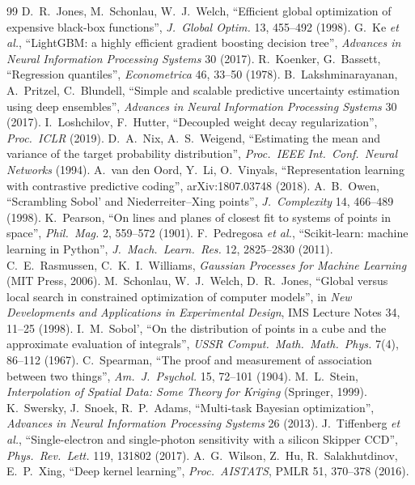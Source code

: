 \documentclass[10pt,a4paper]{article}
\begin{document}
\begin{thebibliography}{99}
 D.~R.~Jones, M.~Schonlau, W.~J.~Welch, ``Efficient global optimization of expensive black-box functions'', \emph{J.\ Global Optim.} 13, 455--492 (1998).
 G.~Ke \emph{et al.}, ``LightGBM: a highly efficient gradient boosting decision tree'', \emph{Advances in Neural Information Processing Systems} 30 (2017).
 R.~Koenker, G.~Bassett, ``Regression quantiles'', \emph{Econometrica} 46, 33--50 (1978).
 B.~Lakshminarayanan, A.~Pritzel, C.~Blundell, ``Simple and scalable predictive uncertainty estimation using deep ensembles'', \emph{Advances in Neural Information Processing Systems} 30 (2017).
 I.~Loshchilov, F.~Hutter, ``Decoupled weight decay regularization'', \emph{Proc.\ ICLR} (2019).
 D.~A.~Nix, A.~S.~Weigend, ``Estimating the mean and variance of the target probability distribution'', \emph{Proc.\ IEEE Int.\ Conf.\ Neural Networks} (1994).
 A.~van den Oord, Y.~Li, O.~Vinyals, ``Representation learning with contrastive predictive coding'', arXiv:1807.03748 (2018).
 A.~B.~Owen, ``Scrambling Sobol' and Niederreiter--Xing points'', \emph{J.\ Complexity} 14, 466--489 (1998).
 K.~Pearson, ``On lines and planes of closest fit to systems of points in space'', \emph{Phil.\ Mag.} 2, 559--572 (1901).
 F.~Pedregosa \emph{et al.}, ``Scikit-learn: machine learning in Python'', \emph{J.\ Mach.\ Learn.\ Res.} 12, 2825--2830 (2011).
 C.~E.~Rasmussen, C.~K.~I.~Williams, \emph{Gaussian Processes for Machine Learning} (MIT Press, 2006).
 M.~Schonlau, W.~J.~Welch, D.~R.~Jones, ``Global versus local search in constrained optimization of computer models'', in \emph{New Developments and Applications in Experimental Design}, IMS Lecture Notes 34, 11--25 (1998).
 I.~M.~Sobol', ``On the distribution of points in a cube and the approximate evaluation of integrals'', \emph{USSR Comput.\ Math.\ Math.\ Phys.} 7(4), 86--112 (1967).
 C.~Spearman, ``The proof and measurement of association between two things'', \emph{Am.\ J.\ Psychol.} 15, 72--101 (1904).
 M.~L.~Stein, \emph{Interpolation of Spatial Data: Some Theory for Kriging} (Springer, 1999).
 K.~Swersky, J.~Snoek, R.~P.~Adams, ``Multi-task Bayesian optimization'', \emph{Advances in Neural Information Processing Systems} 26 (2013).
 J.~Tiffenberg \emph{et al.}, ``Single-electron and single-photon sensitivity with a silicon Skipper CCD'', \emph{Phys.\ Rev.\ Lett.} 119, 131802 (2017).
 A.~G.~Wilson, Z.~Hu, R.~Salakhutdinov, E.~P.~Xing, ``Deep kernel learning'', \emph{Proc.\ AISTATS}, PMLR 51, 370--378 (2016).
\end{thebibliography}
\end{document}
